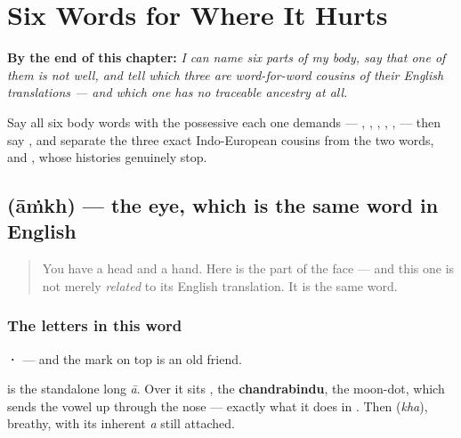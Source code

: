 
\chapter{Six Words for Where It Hurts}
\label{ch:hi-where-it-hurts}

\begin{chapteropening}
\textbf{By the end of this chapter:} \emph{I can name six parts of my body, say that one of them is not well, and tell which three are word-for-word cousins of their English translations — and which one has no traceable ancestry at all.}

Say all six body words with the possessive each one demands —  ,  ,  ,  ,  ,   — then say     , and separate the three exact Indo-European cousins from the two words,  and , whose histories genuinely stop.
\end{chapteropening}

\section[\texorpdfstring{\hi{आँख} (āṁkh)}{आँख (āṁkh)}]{ (āṁkh) — the eye, which is the same word in English}

\label{lesson:HI-C38-aankh}



\begin{quote}
You have a head and a hand. Here is the part of the face — and this one is not merely \emph{related} to its English translation. It is the same word.
\end{quote}

\subsection*{The letters in this word}
\textbf{·} — and the mark on top is an old friend.

\textbf{} is the standalone long \emph{ā}. Over it sits \textbf{}, the \textbf{chandrabindu}, the moon-dot, which sends the vowel up through the nose — exactly what it does in \textbf{}. Then \textbf{} (\emph{kha}), breathy, with its inherent \emph{a} still attached.

